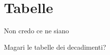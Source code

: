 \FloatBarrier

\section{Tabelle}
Non credo ce ne siano

Magari le tabelle dei decadimenti?

\FloatBarrier


